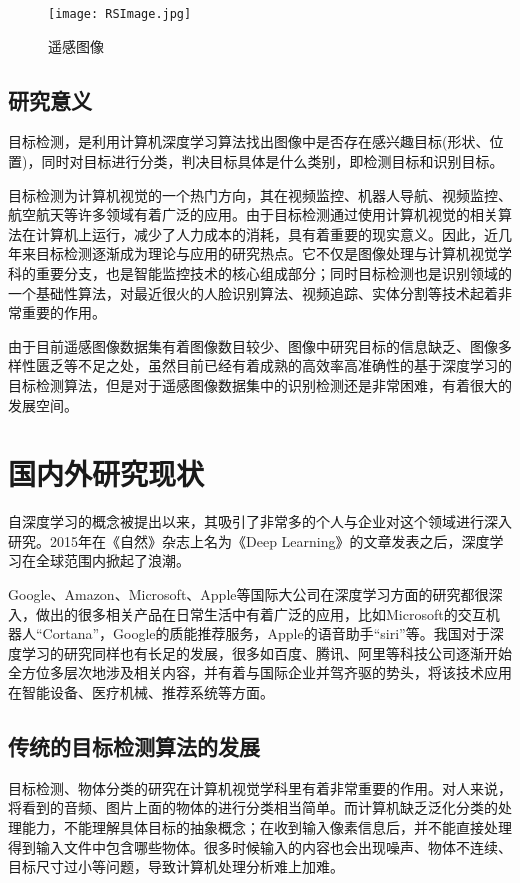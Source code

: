 \begin{figure}
	\center
	{\texttt{[image: RSImage.jpg]}}
	\caption{遥感图像}
	\label{RSImage}
\end{figure}


\subsection{研究意义}

目标检测，是利用计算机深度学习算法找出图像中是否存在感兴趣目标(形状、位置)，同时对目标进行分类，判决目标具体是什么类别，即检测目标和识别目标。

目标检测为计算机视觉的一个热门方向，其在视频监控、机器人导航、视频监控、航空航天等许多领域有着广泛的应用。由于目标检测通过使用计算机视觉的相关算法在计算机上运行，减少了人力成本的消耗，具有着重要的现实意义。因此，近几年来目标检测逐渐成为理论与应用的研究热点。它不仅是图像处理与计算机视觉学科的重要分支，也是智能监控技术的核心组成部分；同时目标检测也是识别领域的一个基础性算法，对最近很火的人脸识别算法、视频追踪、实体分割等技术起着非常重要的作用。

由于目前遥感图像数据集有着图像数目较少、图像中研究目标的信息缺乏、图像多样性匮乏等不足之处，虽然目前已经有着成熟的高效率高准确性的基于深度学习的目标检测算法，但是对于遥感图像数据集中的识别检测还是非常困难，有着很大的发展空间。


\section{国内外研究现状}

自深度学习的概念被提出以来，其吸引了非常多的个人与企业对这个领域进行深入研究。2015年在《自然》杂志上名为《Deep Learning》\cite{Deep}的文章发表之后，深度学习在全球范围内掀起了浪潮。

Google、Amazon、Microsoft、Apple等国际大公司在深度学习方面的研究都很深入，做出的很多相关产品在日常生活中有着广泛的应用，比如Microsoft的交互机器人“Cortana”，Google的质能推荐服务，Apple的语音助手“siri”等。我国对于深度学习的研究同样也有长足的发展，很多如百度、腾讯、阿里等科技公司逐渐开始全方位多层次地涉及相关内容，并有着与国际企业并驾齐驱的势头，将该技术应用在智能设备、医疗机械、推荐系统等方面。

\subsection{传统的目标检测算法的发展}

目标检测、物体分类的研究在计算机视觉学科里有着非常重要的作用。对人来说，将看到的音频、图片上面的物体的进行分类相当简单。而计算机缺乏泛化分类的处理能力，不能理解具体目标的抽象概念；在收到输入像素信息后，并不能直接处理得到输入文件中包含哪些物体。很多时候输入的内容也会出现噪声、物体不连续、目标尺寸过小等问题，导致计算机处理分析难上加难。

